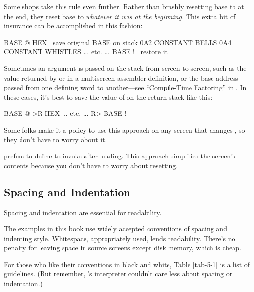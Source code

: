 Some shops take this rule even further.  Rather than brashly resetting
base to  at the end, they reset base to \emph{whatever
it was at the beginning.} This extra bit of insurance can be
accomplished in this fashion:
\begin{Code}
BASE @       HEX    \ save original BASE on stack
0A2 CONSTANT BELLS
0A4 CONSTANT WHISTLES
... etc. ...
BASE !              \ restore it
\end{Code}
\noindent Sometimes an argument is passed on the stack from screen to
screen, such as the value returned by  or  in a
multiscreen assembler definition, or the base address passed from one
defining word to another---see ``Compile-Time Factoring'' in .
In these cases, it's best to save the value of  on the
return stack like this:
\begin{Code}
BASE @ >R     HEX
... etc. ...
R> BASE !
\end{Code}
Some folks make it a policy to use this approach on any screen that
changes , so they don't have to worry about it.%

 prefers to define 
to invoke  after loading.  This approach simplifies the
screen's contents because you don't have to worry about resetting.%

\subsection{Spacing and Indentation}%

\begin{tip}
Spacing and indentation are essential for readability.
\end{tip}
The examples in this book use widely accepted conventions of spacing
and indenting style.  Whitespace, appropriately used, lends
readability.  There's no penalty for leaving space in source screens
except disk memory, which is cheap.

For those who like their conventions in black and white, Table
\ref{tab-5-1} is a list of guidelines.  (But remember, \Forth{}'s
interpreter couldn't care less about spacing or indentation.)

